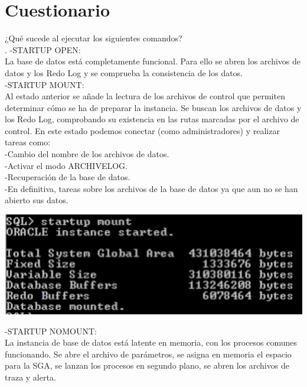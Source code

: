 \section{Cuestionario} 
	\item ¿Qué sucede al ejecutar los siguientes comandos?\\.
	  -STARTUP OPEN:\\
    La base de datos está completamente funcional. Para ello se abren los archivos de datos y los Redo Log y se comprueba la consistencia de los datos.\\
    
    -STARTUP MOUNT:\\
    Al estado anterior se añade la lectura de los archivos de control que permiten determinar cómo se ha de preparar la instancia. 
    Se buscan los archivos de datos y los Redo Log, comprobando su existencia en las rutas marcadas por el archivo de control.
    En este estado podemos conectar (como administradores) y realizar tareas como:\\
      -Cambio del nombre de los archivos de datos.\\
      -Activar el modo ARCHIVELOG.\\
      -Recuperación de la base de datos.\\
      -En definitiva, tareas sobre los archivos de la base de datos ya que aun no se han abierto sus datos.\\
      
	\begin{center}
	\includegraphics[width=14cm]{./Imagenes/imagen62} 
	\end{center}
  
    -STARTUP NOMOUNT:\\
    La instancia de base de datos está latente en memoria, con los procesos comunes funcionando. 
    Se abre el archivo de parámetros, se asigna en memoria el espacio para la SGA, 
    se lanzan los procesos en segundo plano, se abren los archivos de traza y alerta.\\
    
